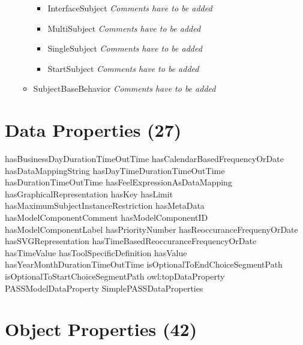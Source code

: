 \begin{itemize}
\begin{itemize}
\begin{itemize}
		\item InterfaceSubject \linebreak \textit{Comments have to be added}
		\item MultiSubject \linebreak \textit{Comments have to be added}
		\item SingleSubject \linebreak \textit{Comments have to be added}
		\item StartSubject \linebreak \textit{Comments have to be added}
	\end{itemize}
	\item SubjectBaseBehavior \linebreak \textit{Comments have to be added}
\end{itemize}
\end{itemize}	

			
			
			
			










\section{Data Properties (27)}

hasBusinessDayDurationTimeOutTime
hasCalendarBasedFrequencyOrDate
hasDataMappingString
hasDayTimeDurationTimeOutTime
hasDurationTimeOutTime
hasFeelExpressionAsDataMapping
hasGraphicalRepresentation
hasKey
hasLimit
hasMaximumSubjectInstanceRestriction
hasMetaData
hasModelComponentComment
hasModelComponentID
hasModelComponentLabel
hasPriorityNumber
hasReoccuranceFrequenyOrDate
hasSVGRepresentation
hasTimeBasedReoccuranceFrequencyOrDate
hasTimeValue
hasToolSpecificDefinition
hasValue
hasYearMonthDurationTimeOutTime
isOptionalToEndChoiceSegmentPath
isOptionalToStartChoiceSegmentPath
owl:topDataProperty
PASSModelDataProperty
SimplePASSDataProperties




\section{Object Properties (42)}

